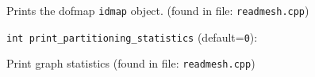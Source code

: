 Prints the dofmap \verb+idmap+ object. 
 (found in file: \verb+readmesh.cpp+)
\item\verb+int print_partitioning_statistics+ {\rm(default=\verb|0|)}:

Print graph statistics
 (found in file: \verb+readmesh.cpp+)
